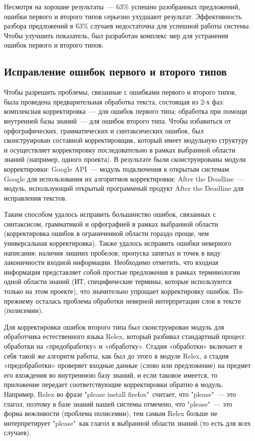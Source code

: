 Несмотря на хорошие результаты~--- 63\% успешно разобранных предложений, ошибки первого и второго типов серьезно ухудшают результат. Эффективность разбора предложений в 63\% случаев недостаточна для успешной работы системы. Чтобы улучшить показатель, был разработан комплекс мер для устранения ошибок первого и второго типов.
	
 
\subsection{Исправление ошибок первого и второго типов} \label{sect2_2}
Чтобы разрешить проблемы, связанные с ошибками первого и второго типов, была проведена предварительная обработка текста, состоящая из 2-х фаз: комплексная корректировка~--- для ошибок первого типа; обработка при помощи внутренней базы знаний~--- для ошибок второго типа. 
Чтобы избавиться от орфографических, грамматических и синтаксических ошибок, был сконструирован составной корректировщик, который имеет модульную структуру и осуществляет корректировку последовательно в рамках выбранной области знаний (например, одного проекта). В результате были сконструированы модули корректировки: Google API~--- модуль подключения к открытым системам Google для использования их алгоритмов корректировки; After the Deadline~--- модуль, использующий открытый программный продукт After the Deadline для исправления текстов. 

Таким способом удалось исправить большинство ошибок, связанных с синтаксисом, грамматикой и орфографией в рамках выбранной области (корректировка ошибок в ограниченной области гораздо проще, чем универсальная корректировка). Также удалось исправить ошибки неверного написания: наличия лишних пробелов, пропуска запятых и точек в виду лаконичности входной информации. Необходимо отметить, что входная информация представляет собой простые предложения в рамках терминологии одной области знаний (ИТ, специфические термины, которые используются только на этом проекте), что значительно упрощает корректировку ошибок. По-прежнему осталась проблема обработки неверной интерпретации слов в тексте (полисемии). \par

Для корректировки ошибок второго типа был сконструирован модуль для обработчика естественного языка Relex, который разбивал стандартный процесс обработки на «предобработку» и «обработку». Стадия «обработки» включает в себя такой же алгоритм работы, как был до этого в модуле Relex, а стадия «предобработки» проверяет входные данные (слово или предложение) на предмет его вхождения во внутреннюю базу знаний, и если таковое имеется, то приложение передает соответствующие корректировки обратно в модуль. Например, Relex во фразе "please install firefox"\ считает, что "please"\ --- это глагол, поэтому в базе знаний нашей системы отмечено, что "please"\ --- это форма вежливости (проблема полисемии), тем самым Relex больше не интерпретирует "please"\ как глагол в выбранной области знаний (то есть для всех случаев).


